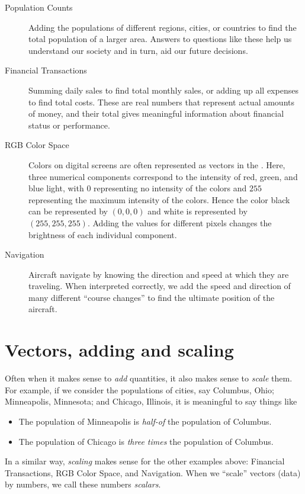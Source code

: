 \documentclass{ximera}
\begin{document}
\begin{concept}
\begin{description}
\item[Population Counts] Adding the populations of different regions,
  cities, or countries to find the total population of a larger
  area. Answers to questions like these help us understand our
  society and in turn, aid our future decisions.
\item[Financial Transactions] Summing daily sales to find total
  monthly sales, or adding up all expenses to find total costs. These
  are real numbers that represent actual amounts of money, and their
  total gives meaningful information about financial status or
  performance.
\item[RGB Color Space] Colors on digital screens are often represented
  as vectors in the .
  Here, three numerical components correspond to the intensity of red,
  green, and blue light, with $0$ representing no intensity of the
  colors and $255$ representing the maximum intensity of the
  colors. Hence the color black can be represented by $(0,0,0)$ and
  white is represented by\break $(255,255,255)$.  Adding the values for
  different pixels changes the brightness of each individual
  component.
\item[Navigation] Aircraft navigate by knowing the direction and speed
  at which they are traveling. When interpreted correctly, we add the
  speed and direction of many different ``course changes'' to find the
  ultimate position of the aircraft.
\end{description}
\end{concept}



\section{Vectors, adding and scaling}


Often when it makes sense to \textit{add} quantities, it also makes
sense to \textit{scale} them. For example, if we consider the
populations of cities, say Columbus, Ohio; Minneapolis, Minnesota; and
Chicago, Illinois, it is meaningful to say things like
\begin{itemize}
\item The population of Minneapolis is \textit{half-of} the population of Columbus.
\item The population of Chicago is \textit{three times} the population of Columbus.
\end{itemize}
In a similar way, \textit{scaling} makes sense for the other examples
above: Financial Transactions, RGB Color Space, and Navigation. When
we ``scale'' vectors (data) by numbers, we call these numbers
\textit{scalars}.
\end{document}

